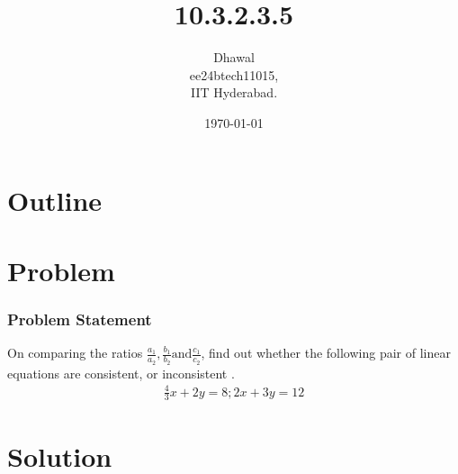 \documentclass{beamer}
\title{10.3.2.3.5}
\author{Dhawal \\ ee24btech11015,\\IIT Hyderabad.}
\date{\today}
\theoremstyle{remark}
\numberwithin{equation}{section}
\begin{document}
\begin{frame}
\titlepage
\end{frame}

\section*{Outline}
\begin{frame}
\tableofcontents
\end{frame}
\section{Problem}
\begin{frame}
\frametitle{Problem Statement}
%
 On comparing the ratios $\frac{a_1}{a_2},\frac{b_1}{b_2} \text{and} \frac{c_1}{c_2}$, find out whether the following pair of linear equations are consistent, or inconsistent . 
	\begin{align}
		\frac{4}{3}x + 2y = 8 ; 2x + 3y = 12
	\end{align}

\end{frame}

\section{Solution}
\end{document}

